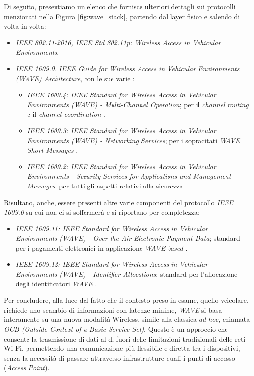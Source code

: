 Di seguito, presentiamo un elenco che fornisce ulteriori dettagli sui protocolli menzionati nella Figura \ref{fig:wave_stack}, partendo dal layer fisico e salendo di volta in volta:

\begin{itemize}
    \item \textit{IEEE 802.11-2016, IEEE Std 802.11p: Wireless Access in Vehicular Environments}.
    \item \textit{IEEE 1609.0: IEEE Guide for Wireless Access in Vehicular Environments (WAVE) Architecture}, con le sue varie  \cite{8686445}: 
        \begin{itemize}
            \item \textit{IEEE 1609.4: IEEE Standard for Wireless Access in Vehicular Environments (WAVE) - Multi-Channel Operation}; per il \textit{channel routing} e il \textit{channel coordination} \cite{7435228}.
            \item \textit{IEEE 1609.3: IEEE Standard for Wireless Access in Vehicular Environments (WAVE) - Networking Services}; per i sopracitati \textit{WAVE Short Messages} \cite{9374154}.
            \item \textit{IEEE 1609.2: IEEE Standard for Wireless Access in Vehicular Environments - Security Services for Applications and Management Messages}; per tutti gli aspetti relativi alla sicurezza \cite{10075082}.
        \end{itemize}
\end{itemize}

Risultano, anche, essere presenti altre varie componenti del protocollo \textit{IEEE 1609.0} su cui non ci si soffermerà e si riportano per completezza:

\begin{itemize}
    \item \textit{IEEE 1609.11:  IEEE Standard for Wireless Access in Vehicular Environments (WAVE) - Over-the-Air Electronic Payment Data}; standard per i pagamenti elettronici in applicazione \textit{WAVE based} \cite{5692959}.
    \item \textit{IEEE 1609.12:  IEEE Standard for Wireless Access in Vehicular Environments (WAVE) - Identifier Allocations}; standard per l'allocazione degli identificatori \textit{WAVE} \cite{8877516}.
\end{itemize}

Per concludere, alla luce del fatto che il contesto preso in esame, quello veicolare, richiede uno scambio di informazioni con latenze minime, \textit{WAVE} si basa interamente su una nuova modalità Wireless, simile alla classica \textit{ad hoc}, chiamata \textit{OCB (Outside Context of a Basic Service Set)}. Questo è un approccio che consente la trasmissione di dati al di fuori delle limitazioni tradizionali delle reti Wi-Fi, permettendo una comunicazione più flessibile e diretta tra i dispositivi, senza la necessità di passare attraverso infrastrutture quali i punti di accesso (\textit{Access Point}).

